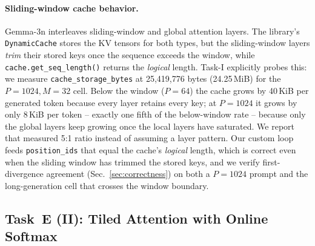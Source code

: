 \documentclass[conference]{IEEEtran}
\newcommand{\code}[1]{\texttt{\small #1}}
\begin{document}
\paragraph*{Sliding-window cache behavior.}
Gemma-3n interleaves sliding-window and global attention layers.
The library's \code{DynamicCache} stores the KV tensors for both
types, but the sliding-window layers \emph{trim} their stored
keys once the sequence exceeds the window, while
\code{cache.get\_seq\_length()} returns the \emph{logical}
length. Task-I explicitly probes this: we measure
\code{cache\_storage\_bytes} at 25{,}419{,}776 bytes
(24.25\,MiB) for the $P=1024, M=32$ cell. Below the window
($P=64$) the cache grows by 40\,KiB per generated token because
every layer retains every key; at $P=1024$ it grows by only
8\,KiB per token -- exactly one fifth of the below-window rate --
because only the global layers keep growing once the local layers
have saturated. We report that measured 5:1 ratio instead of
assuming a layer pattern. Our custom loop feeds
\code{position\_ids} that equal the cache's \emph{logical} length,
which is correct even when the sliding window has trimmed the
stored keys, and we verify first-divergence agreement
(Sec.~\ref{sec:correctness}) on both a $P=1024$ prompt and the
long-generation cell that crosses the window boundary.

\subsection{Task~E (II): Tiled Attention with Online Softmax}
\label{sec:tiled}
\end{document}

